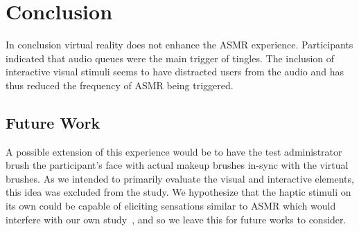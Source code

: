 \documentclass{sigchi}
\begin{document}
\section{Conclusion}
In conclusion virtual reality does not enhance the ASMR experience. Participants indicated that audio queues were the main trigger of tingles. The inclusion of interactive visual stimuli seems to have distracted users from the audio and has thus reduced the frequency of ASMR being triggered.


\subsection{Future Work}

A possible extension of this experience would be to have the test administrator brush the participant's face with actual makeup brushes in-sync with the virtual brushes. As we intended to primarily evaluate the visual and interactive elements, this idea was excluded from the study. We hypothesize that the haptic stimuli on its own could be capable of eliciting sensations similar to ASMR which would interfere with our own study~\cite{hall1897psychology}, and so we leave this for future works to consider.



\end{document}
